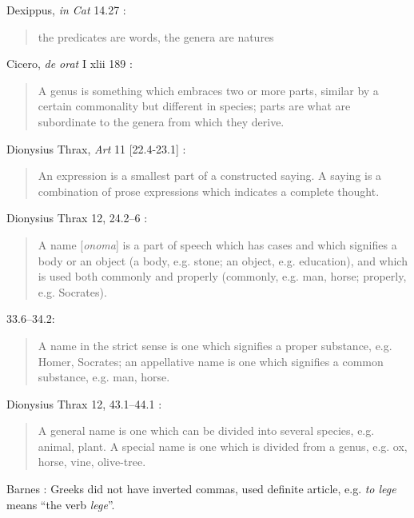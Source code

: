 \documentclass{article}
\begin{document}
Dexippus, {\em in Cat} 14.27 \cite[p.~76]{isagoge}:

\begin{quote}
the predicates are words, the genera are natures
\end{quote}





Cicero, {\em de orat} I xlii 189 \cite[p.~63]{isagoge}:

\begin{quote}
A genus is something which embraces two or more parts, similar by a certain commonality but different in species; parts are what are subordinate to the genera from which they derive.
\end{quote}

Dionysius Thrax, {\em Art} 11 [22.4-23.1] \cite[p.~207]{barnes}:

\begin{quote}
An expression is a smallest part of a constructed saying. A saying is a combination of prose expressions which indicates a complete thought.
\end{quote}

Dionysius Thrax 12, 24.2--6 \cite[p.~315]{isagoge}:

\begin{quote}
A name [{\em onoma}] is a part of speech which has cases and which signifies a body or an object (a body, e.g. stone; an object, e.g. education), and which is used both commonly and properly (commonly, e.g. man, horse; properly, e.g. Socrates).
\end{quote}

33.6--34.2:

\begin{quote}
A name in the strict sense is one which signifies a proper substance, e.g. Homer, Socrates; an appellative name is one which signifies a common substance, e.g. man, horse.
\end{quote}

Dionysius Thrax 12, 43.1--44.1 \cite[p.~64]{isagoge}:

\begin{quote}
A general name is one which can be divided into several species, e.g. animal, plant. A special name is one which is divided from a genus, e.g. ox, horse, vine, olive-tree.
\end{quote}

Barnes \cite[pp.~319--320]{isagoge}: Greeks did not have inverted commas, used definite article, e.g. {\em to lege} means ``the verb {\em lege}''.
\end{document}
